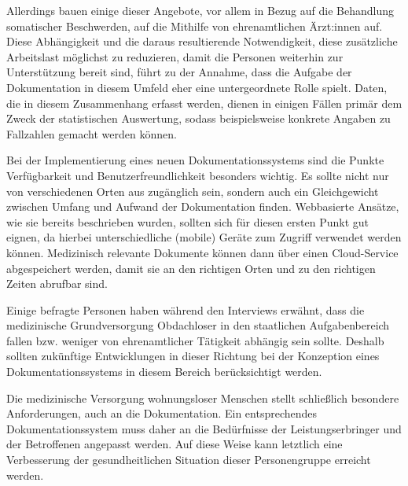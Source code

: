 Allerdings bauen einige dieser Angebote, vor allem in Bezug auf die Behandlung somatischer Beschwerden, auf die Mithilfe von ehrenamtlichen Ärzt:innen auf. Diese Abhängigkeit und die daraus resultierende Notwendigkeit, diese zusätzliche Arbeitslast möglichst zu reduzieren, damit die Personen weiterhin zur Unterstützung bereit sind, führt zu der Annahme, dass die Aufgabe der Dokumentation in diesem Umfeld eher eine untergeordnete Rolle spielt. Daten, die in diesem Zusammenhang erfasst werden, dienen in einigen Fällen primär dem Zweck der statistischen Auswertung, sodass beispielsweise konkrete Angaben zu Fallzahlen gemacht werden können.

Bei der Implementierung eines neuen Dokumentationssystems sind die Punkte Verfügbarkeit und Benutzerfreundlichkeit besonders wichtig. Es sollte nicht nur von verschiedenen Orten aus zugänglich sein, sondern auch ein Gleichgewicht zwischen Umfang und Aufwand der Dokumentation finden. Webbasierte Ansätze, wie sie bereits beschrieben wurden, sollten sich für diesen ersten Punkt gut eignen, da hierbei unterschiedliche (mobile) Geräte zum Zugriff verwendet werden können. Medizinisch relevante Dokumente können dann über einen Cloud-Service abgespeichert werden, damit sie an den richtigen Orten und zu den richtigen Zeiten abrufbar sind.

Einige befragte Personen haben während den Interviews erwähnt, dass die medizinische Grundversorgung Obdachloser in den staatlichen Aufgabenbereich fallen bzw. weniger von ehrenamtlicher Tätigkeit abhängig sein sollte. Deshalb sollten zukünftige Entwicklungen in dieser Richtung bei der Konzeption eines Dokumentationssystems in diesem Bereich berücksichtigt werden.

Die medizinische Versorgung wohnungsloser Menschen stellt schließlich besondere Anforderungen, auch an die Dokumentation. Ein entsprechendes Dokumentationssystem muss daher an die Bedürfnisse der Leistungserbringer und der Betroffenen angepasst werden. Auf diese Weise kann letztlich eine Verbesserung der gesundheitlichen Situation dieser Personengruppe erreicht werden.
